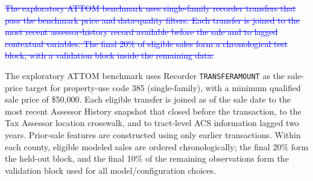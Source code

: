\documentclass[10pt]{article}
\theoremstyle{definition}
\newcommand{\1}{\mathbf{1}}
\newcommand{\oldtext}[1]{\textcolor{blue}{\sout{#1}}}
\newcommand{\newtext}[1]{\textcolor{impGreen}{#1}}
\begin{document}
\oldtext{The exploratory ATTOM benchmark uses single-family recorder transfers that pass the benchmark price and data-quality filters. Each transfer is joined to the most recent assessor-history record available before the sale and to lagged contextual variables. The final 20\% of eligible sales form a chronological test block, with a validation block inside the remaining data.}

\newtext{The exploratory ATTOM benchmark uses Recorder \texttt{TRANSFERAMOUNT} as the sale-price target for property-use code 385 (single-family), with a minimum qualified sale price of \$50,000. Each eligible transfer is joined as of the sale date to the most recent Assessor History snapshot that closed before the transaction, to the Tax Assessor location crosswalk, and to tract-level ACS information lagged two years. Prior-sale features are constructed using only earlier transactions. Within each county, eligible modeled sales are ordered chronologically; the final 20\% form the held-out block, and the final 10\% of the remaining observations form the validation block used for all model/configuration choices.}
\end{document}

